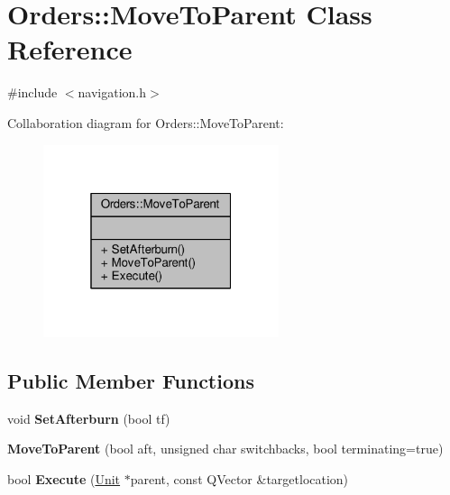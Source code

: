 \hypertarget{classOrders_1_1MoveToParent}{}\section{Orders\+:\+:Move\+To\+Parent Class Reference}
\label{classOrders_1_1MoveToParent}


{\ttfamily \#include $<$navigation.\+h$>$}



Collaboration diagram for Orders\+:\+:Move\+To\+Parent\+:
\nopagebreak
\begin{figure}[H]
\begin{center}
\leavevmode
\includegraphics[width=196pt]{df/dd6/classOrders_1_1MoveToParent__coll__graph}
\end{center}
\end{figure}
\subsection*{Public Member Functions}
\begin{DoxyCompactItemize}
\item 
void {\bfseries Set\+Afterburn} (bool tf)\hypertarget{classOrders_1_1MoveToParent_a19f35742de6393dcd2100da0af5e892a}{}\label{classOrders_1_1MoveToParent_a19f35742de6393dcd2100da0af5e892a}

\item 
{\bfseries Move\+To\+Parent} (bool aft, unsigned char switchbacks, bool terminating=true)\hypertarget{classOrders_1_1MoveToParent_a26e12c6fb539e8b5bb0d59d2081fbe03}{}\label{classOrders_1_1MoveToParent_a26e12c6fb539e8b5bb0d59d2081fbe03}

\item 
bool {\bfseries Execute} (\hyperlink{classUnit}{Unit} $\ast$parent, const Q\+Vector \&targetlocation)\hypertarget{classOrders_1_1MoveToParent_acc9b628ca268b6dd93815a99dfcfd7b7}{}\label{classOrders_1_1MoveToParent_acc9b628ca268b6dd93815a99dfcfd7b7}

\end{DoxyCompactItemize}


